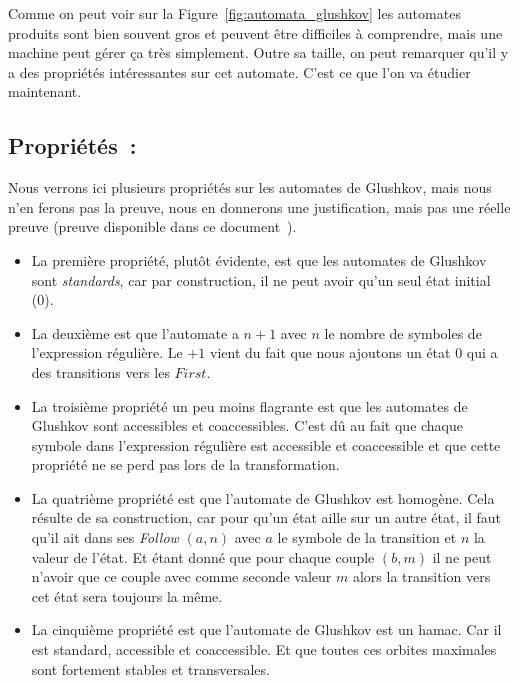 \vphantom{}

Comme on peut voir sur la Figure~\ref{fig:automata_glushkov} les automates
produits sont bien souvent gros et peuvent être difficiles à comprendre, mais
une machine peut gérer ça très simplement. Outre sa taille, on peut remarquer
qu'il y a des propriétés intéressantes sur cet automate. C'est ce que l'on va
étudier maintenant.

\subsection{Propriétés~:}

Nous verrons ici plusieurs propriétés sur les automates de Glushkov, mais nous
n'en ferons pas la preuve, nous en donnerons une justification, mais pas une
réelle preuve (preuve disponible dans ce
document~\cite{DBLP:journals/tcs/CaronZ00}).

\vphantom{}

\begin{itemize}[label=\textbullet]
    \item La première propriété, plut\^{o}t évidente, est que les automates de
          Glushkov sont \textit{standards}, car par construction, il ne peut
          avoir qu'un seul état initial (0).

          \vphantom{}

    \item La deuxième est que l'automate a \(n + 1\) avec \(n\) le nombre de
      symboles de l'expression régulière. Le \(+ 1\) vient du fait que nous
      ajoutons un état \(0\) qui a des transitions vers les \(First\).

          \vphantom{}

    \item La troisième propriété un peu moins flagrante est que les automates de
      Glushkov sont accessibles et coaccessibles. C'est dû au fait que chaque
      symbole dans l'expression régulière est accessible et coaccessible et que
      cette propriété ne se perd pas lors de la transformation.

          \vphantom{}

    \item La quatrième propriété est que l'automate de Glushkov est homogène. Cela
      résulte de sa construction, car pour qu'un état aille sur un autre état,
      il faut qu'il ait dans ses \textit{Follow} \((a, n)\) avec \(a\) le
      symbole de la transition et \(n\) la valeur de l'état. Et étant donné que
      pour chaque couple \((b, m)\) il ne peut n'avoir que ce couple avec comme
      seconde valeur \(m\) alors la transition vers cet état sera toujours la
      même.

          \vphantom{}

    \item La cinquième propriété est que l'automate de Glushkov est un hamac. Car
      il est standard, accessible et coaccessible. Et que toutes ces orbites
      maximales sont fortement stables et transversales.

          \vphantom{}
\end{itemize}

